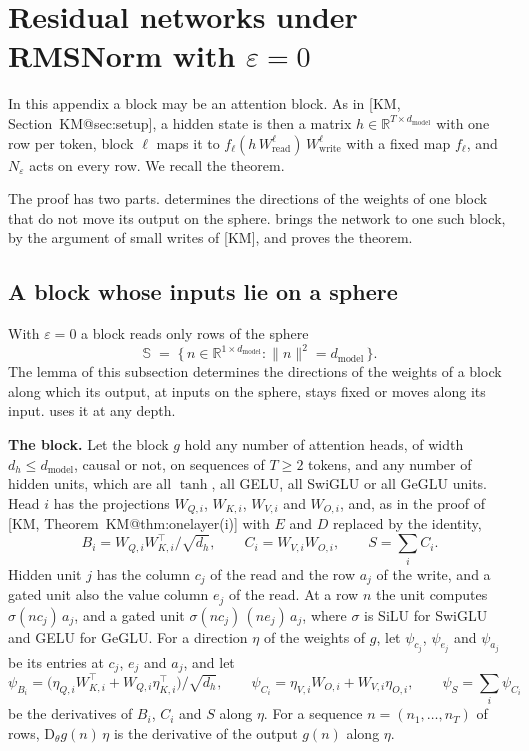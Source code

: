 \documentclass[10pt]{article}
\makeatletter
\theoremstyle{definition}
\theoremstyle{remark}
\newcommand{\R}{\mathbb{R}}
\newcommand{\Wread}{W_{\mathrm{read}}}
\newcommand{\Wwrite}{W_{\mathrm{write}}}
\newcommand{\dm}{d_{\mathrm{model}}}
\newcommand{\Der}{\mathrm{D}}
\newcommand{\norm}[1]{\lVert #1\rVert}
\newcommand{\para}[1]{\smallskip\noindent\textbf{#1}\hspace{0.5em}}
\newcommand{\KMn}[1]{\csname KM@#1\endcsname}
\newcommand{\KMp}[3]{[KM, #1~\KMn{#2}(#3)]}
\makeatother
\begin{document}
\section{Residual networks under RMSNorm with \texorpdfstring{$\varepsilon = 0$}{no regularization}}\label{app:epszero}

In this appendix a block may be an attention block. As in [KM, Section~\KMn{sec:setup}], a hidden state is then a matrix $h \in \R^{T\times\dm}$ with one row per token, block $\ell$ maps it to $f_\ell(h\,\Wread^{\ell})\,\Wwrite^{\ell}$ with a fixed map $f_\ell$, and $N_\varepsilon$ acts on every row. We recall the theorem.

\thmEpsZero*

The proof has two parts.  determines the directions of the weights of one block that do not move its output on the sphere.  brings the network to one such block, by the argument of small writes of [KM], and proves the theorem.

\subsection{A block whose inputs lie on a sphere}\label{app:sphere}

With $\varepsilon = 0$ a block reads only rows of the sphere
\[
\mathbb S \;=\; \big\{\,n \in \R^{1\times\dm} : \norm{n}^2 = \dm\,\big\}.
\]
The lemma of this subsection determines the directions of the weights of a block along which its output, at inputs on the sphere, stays fixed or moves along its input.  uses it at any depth.

\para{The block.} Let the block $g$ hold any number of attention heads, of width $d_h \le \dm$, causal or not, on sequences of $T \ge 2$ tokens, and any number of hidden units, which are all $\tanh$, all GELU, all SwiGLU or all GeGLU units. Head $i$ has the projections $W_{Q,i}$, $W_{K,i}$, $W_{V,i}$ and $W_{O,i}$, and, as in the proof of \KMp{Theorem}{thm:onelayer}{i} with $E$ and $D$ replaced by the identity,
\[
B_i = W_{Q,i}W_{K,i}^\top/\sqrt{d_h}, \qquad C_i = W_{V,i}W_{O,i}, \qquad S = \textstyle\sum_i C_i .
\]
Hidden unit $j$ has the column $c_j$ of the read and the row $a_j$ of the write, and a gated unit also the value column $e_j$ of the read. At a row $n$ the unit computes $\sigma(nc_j)\,a_j$, and a gated unit $\sigma(nc_j)\,(ne_j)\,a_j$, where $\sigma$ is SiLU for SwiGLU and GELU for GeGLU. For a direction $\eta$ of the weights of $g$, let $\psi_{c_j}$, $\psi_{e_j}$ and $\psi_{a_j}$ be its entries at $c_j$, $e_j$ and $a_j$, and let
\[
\psi_{B_i} = \big(\eta_{Q,i}W_{K,i}^\top + W_{Q,i}\eta_{K,i}^\top\big)/\sqrt{d_h}, \qquad \psi_{C_i} = \eta_{V,i}W_{O,i} + W_{V,i}\eta_{O,i}, \qquad \psi_S = \textstyle\sum_i \psi_{C_i}
\]
be the derivatives of $B_i$, $C_i$ and $S$ along $\eta$. For a sequence $n = (n_1, \dots, n_T)$ of rows, $\Der_\theta g(n)\,\eta$ is the derivative of the output $g(n)$ along $\eta$.
\end{document}
